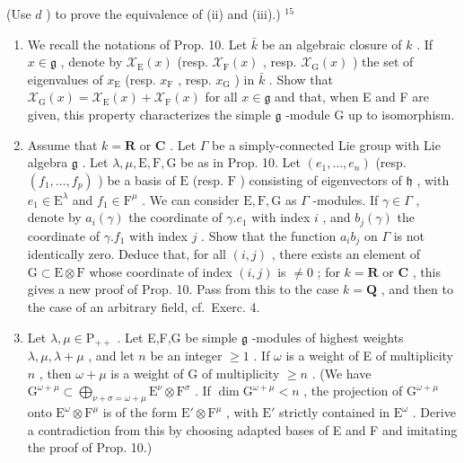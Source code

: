 (Use \(d\) ) to prove the equivalence of (ii) and (iii).) \(^{15}\)

\begin{enumerate}
\def\labelenumi{\arabic{enumi})}
\setcounter{enumi}{18}
\item
  We recall the notations of Prop. 10. Let \(\bar{k}\) be an algebraic closure of \(k\) . If \(x \in \mathfrak{g}\) , denote by \(\mathcal{X}_{\mathrm{E}}(x)\) (resp. \(\mathcal{X}_{\mathrm{F}}(x)\) , resp. \(\mathcal{X}_{\mathrm{G}}(x)\) ) the set of eigenvalues of \(x_{\mathrm{E}}\) (resp. \(x_{\mathrm{F}}\) , resp. \(x_{\mathrm{G}}\) ) in \(\bar{k}\) . Show that \(\mathcal{X}_{\mathrm{G}}(x) = \mathcal{X}_{\mathrm{E}}(x) + \mathcal{X}_{\mathrm{F}}(x)\) for all \(x \in \mathfrak{g}\) and that, when E and F are given, this property characterizes the simple \(\mathfrak{g}\) -module G up to isomorphism.
\item
  Assume that \(k = \mathbf{R}\) or \(\mathbf{C}\) . Let \(\Gamma\) be a simply-connected Lie group with Lie algebra \(\mathfrak{g}\) . Let \(\lambda, \mu, \mathrm{E}, \mathrm{F}, \mathrm{G}\) be as in Prop. 10. Let \((e_1, \ldots, e_n)\) (resp. \((f_1, \ldots, f_p)\) ) be a basis of \(\mathrm{E}\) (resp. \(\mathrm{F}\) ) consisting of eigenvectors of \(\mathfrak{h}\) , with \(e_1 \in \mathrm{E}^\lambda\) and \(f_1 \in \mathrm{F}^\mu\) . We can consider \(\mathrm{E}, \mathrm{F}, \mathrm{G}\) as \(\Gamma\) -modules. If \(\gamma \in \Gamma\) , denote by \(a_i(\gamma)\) the coordinate of \(\gamma.e_1\) with index \(i\) , and \(b_j(\gamma)\) the coordinate of \(\gamma.f_1\) with index \(j\) . Show that the function \(a_i b_j\) on \(\Gamma\) is not identically zero. Deduce that, for all \((i,j)\) , there exists an element of \(\mathrm{G} \subset \mathrm{E} \otimes \mathrm{F}\) whose coordinate of index \((i,j)\) is \(\neq 0\) ; for \(k = \mathbf{R}\) or \(\mathbf{C}\) , this gives a new proof of Prop. 10. Pass from this to the case \(k = \mathbf{Q}\) , and then to the case of an arbitrary field, cf.~Exerc. 4.
\item
  Let \(\lambda, \mu \in \mathrm{P}_{++}\) . Let E,F,G be simple \(\mathfrak{g}\) -modules of highest weights \(\lambda, \mu, \lambda + \mu\) , and let \(n\) be an integer \(\geq 1\) . If \(\omega\) is a weight of E of multiplicity \(n\) , then \(\omega + \mu\) is a weight of G of multiplicity \(\geq n\) . (We have \(\mathrm{G}^{\omega + \mu} \subset \bigoplus_{\nu + \sigma = \omega + \mu} \mathrm{E}^{\nu} \otimes \mathrm{F}^{\sigma}\) . If \(\dim \mathrm{G}^{\omega + \mu} < n\) , the projection of \(\mathrm{G}^{\omega + \mu}\) onto \(\mathrm{E}^{\omega} \otimes \mathrm{F}^{\mu}\) is of the form \(\mathrm{E}' \otimes \mathrm{F}^{\mu}\) , with \(\mathrm{E}'\) strictly contained in \(\mathrm{E}^{\omega}\) . Derive a contradiction from this by choosing adapted bases of E and F and imitating the proof of Prop. 10.)

\end{enumerate}
